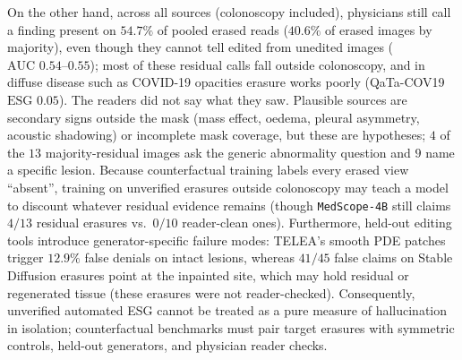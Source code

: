 \documentclass[5p,times,twocolumn,authoryear]{elsarticle}
\begin{document}
On the other hand, across all sources (colonoscopy included), physicians still call a finding present on $54.7\%$ of pooled erased reads ($40.6\%$ of erased images by majority), even though they cannot tell edited from unedited images ($\text{AUC } 0.54\text{--}0.55$); most of these residual calls fall outside colonoscopy, and in diffuse disease such as COVID-19 opacities erasure works poorly (QaTa-COV19 $\text{ESG } 0.05$). The readers did not say what they saw. Plausible sources are secondary signs outside the mask (mass effect, oedema, pleural asymmetry, acoustic shadowing) or incomplete mask coverage, but these are hypotheses; $4$ of the $13$ majority-residual images ask the generic abnormality question and $9$ name a specific lesion. Because counterfactual training labels every erased view ``absent'', training on unverified erasures outside colonoscopy may teach a model to discount whatever residual evidence remains (though \texttt{MedScope-4B} still claims $4/13$ residual erasures vs.\ $0/10$ reader-clean ones). Furthermore, held-out editing tools introduce generator-specific failure modes: TELEA's smooth PDE patches trigger $12.9\%$ false denials on intact lesions, whereas $41/45$ false claims on Stable Diffusion erasures point at the inpainted site, which may hold residual or regenerated tissue (these erasures were not reader-checked). Consequently, unverified automated ESG cannot be treated as a pure measure of hallucination in isolation; counterfactual benchmarks must pair target erasures with symmetric controls, held-out generators, and physician reader checks.
\end{document}
